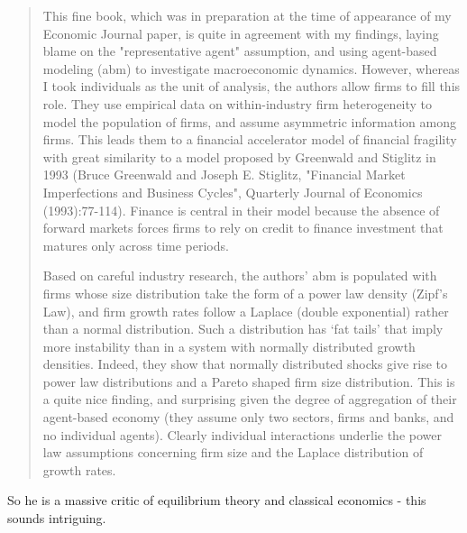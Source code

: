 \begin{quote}
This fine book, which was in preparation at the time of appearance of my Economic Journal paper, is quite in agreement with my findings, laying blame on the "representative agent" assumption, and using agent-based modeling (abm) to investigate macroeconomic dynamics. However, whereas I took individuals as the unit of analysis, the authors allow firms to fill this role. They use empirical data on within-industry firm heterogeneity to model the population of firms, and assume asymmetric information among firms. This leads them to a financial accelerator model of financial fragility with great similarity to a model proposed by Greenwald and Stiglitz in 1993 (Bruce Greenwald and Joseph E. Stiglitz, "Financial Market Imperfections and Business Cycles", Quarterly Journal of Economics (1993):77-114). Finance is central in their model because the absence of forward markets forces firms to rely on credit to finance investment that matures only across time periods.

Based on careful industry research, the authors' abm is populated with firms whose size distribution take the form of a power law density (Zipf's Law), and firm growth rates follow a Laplace (double exponential) rather than a normal distribution. Such a distribution has `fat tails' that imply more instability than in a system with normally distributed growth densities. Indeed, they show that normally distributed shocks give rise to power law distributions and a Pareto shaped firm size distribution. This is a quite nice finding, and surprising given the degree of aggregation of their agent-based economy (they assume only two sectors, firms and banks, and no individual agents). Clearly individual interactions underlie the power law assumptions concerning firm size and the Laplace distribution of growth rates.
\end{quote}

So he is a massive critic of equilibrium theory and classical economics - this sounds intriguing. \\


